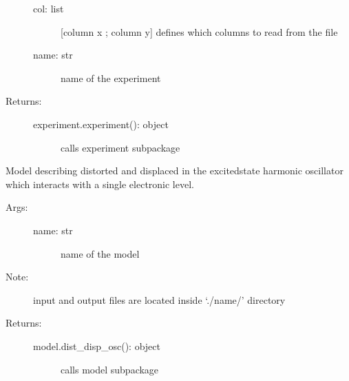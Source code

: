 \documentclass[letterpaper,10pt,english]{sphinxmanual}
\begin{document}
\begin{fulllineitems}
\begin{fulllineitems}
\begin{description}
\begin{description}
\item[{col: list}] \leavevmode
{[}column x ; column y{]} defines which columns to read from the file

\item[{name: str}] \leavevmode
name of the experiment

\end{description}

\item[{Returns:}] \leavevmode\begin{description}
\item[{experiment.experiment(): object}] \leavevmode
calls experiment sub\sphinxhyphen{}package

\end{description}

\end{description}

\end{fulllineitems}


\begin{fulllineitems}
\label{\detokenize{modules/main:phlab.rixs.model_dist_disp_osc}}
Model describing distorted and displaced in the excited\sphinxhyphen{}state harmonic oscillator
which interacts with a single electronic level.
\begin{description}
\item[{Args:}] \leavevmode\begin{description}
\item[{name: str}] \leavevmode
name of the model

\end{description}

\item[{Note:}] \leavevmode
input and output files are located inside  ‘./name/’ directory

\item[{Returns:}] \leavevmode\begin{description}
\item[{model.dist\_disp\_osc(): object}] \leavevmode
calls model sub\sphinxhyphen{}package

\end{description}


\end{description}
\end{fulllineitems}
\end{fulllineitems}
\end{document}
